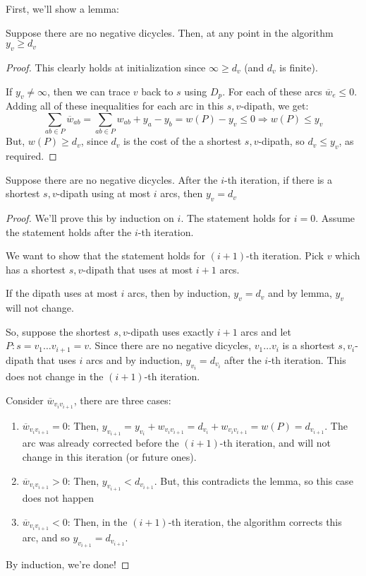 First, we'll show a lemma:
\begin{lemma}{}{}
    Suppose there are no negative dicycles. Then, at any point in the algorithm $y_v \geq d_v$
\end{lemma}
\begin{proof}
    This clearly holds at initialization since $\infty \geq d_v$ (and $d_v$ is finite).

    If $y_v \neq\infty$, then we can trace $v$ back to $s$ using $D_p$. For each of these arcs $\overline{w}_e \leq 0$. Adding all of these inequalities for each arc in this $s,v$-dipath, we get: 
    \begin{equation*}
        \sum_{ab \in P} \overline{w}_{ab} = \sum_{ab \in P} w_{ab} + y_a - y_b = w(P) - y_v \leq 0 \Rightarrow w(P) \leq y_v
    \end{equation*}
    But, $w(P) \geq d_v$, since $d_v$ is the cost of the a shortest $s,v$-dipath, so $d_v \leq y_v$, as required.
\end{proof}

\begin{theorem}{}{}
    Suppose there are no negative dicycles. After the $i$-th iteration, if there is a shortest $s,v$-dipath using at most $i$ arcs, then $y_v = d_v$
\end{theorem}
\begin{proof}
    We'll prove this by induction on $i$. The statement holds for $i = 0$. Assume the statement holds after the $i$-th iteration.

    We want to show that the statement holds for $(i+1)$-th iteration. Pick $v$ which has a shortest $s,v$-dipath that uses at most $i+1$ arcs.

    If the dipath uses at most $i$ arcs, then by induction, $y_v = d_v$ and by lemma, $y_v$ will not change.

    So, suppose the shortest $s,v$-dipath uses exactly $i+1$ arcs and let $P: s=v_1\ldots v_{i+1} =v$. Since there are no negative dicycles, $v_1\ldots v_i$ is a shortest $s,v_i$-dipath that uses $i$ arcs and by induction, $y_{v_i} = d_{v_i}$ after the $i$-th iteration. This does not change in the $(i+1)$-th iteration.

    Consider  $\overline{w}_{v_iv_{i+1}}$, there are three cases:
    \begin{enumerate}
        \item $\overline{w}_{v_iv_{i+1}} = 0$: Then, $y_{v_{i+1}} = y_{v_i} + w_{v_iv_{i+1}} = d_{v_i} + w_{v_iv_{i+1}} = w(P) = d_{v_{i+1}}$. The arc was already corrected before the $(i+1)$-th iteration, and will not change in this iteration (or future ones).
        \item $\overline{w}_{v_iv_{i+1}} > 0$: Then, $y_{v_{i+1}} < d_{v_{i+1}}$. But, this contradicts the lemma, so this case does not happen
        \item $\overline{w}_{v_iv_{i+1}} < 0$: Then, in the $(i+1)$-th iteration, the algorithm corrects this arc, and so $y_{v_{i+1}} = d_{v_{i+1}}$.
    \end{enumerate}
    By induction, we're done!
\end{proof}

